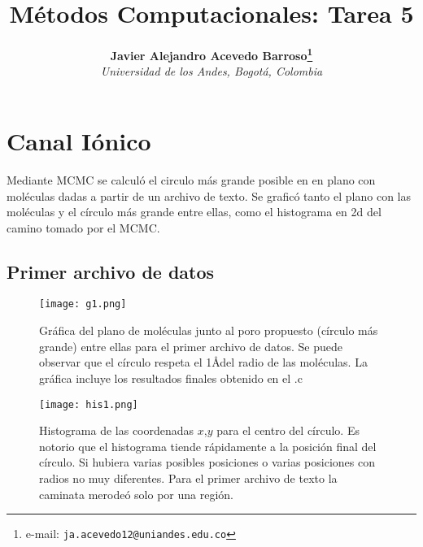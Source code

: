\documentclass[notitlepage,letterpaper,12pt]{article} %
\begin{document}
\title{Métodos Computacionales: Tarea 5
}
\author{
\textbf{Javier Alejandro Acevedo Barroso\thanks{e-mail: \texttt{ja.acevedo12@uniandes.edu.co}}}\\
\textit{Universidad de los Andes, Bogotá, Colombia}\\
} %

\maketitle %



\section{Canal Iónico}

Mediante MCMC se calculó el circulo más grande posible en en plano con moléculas dadas a partir de un archivo de texto. Se graficó tanto el plano con las moléculas y el círculo más grande entre ellas, como el histograma en 2d del camino tomado por el MCMC.

\subsection{Primer archivo de datos}


\begin{figure}[h]
  \centering
   \texttt{[image: g1.png]}
  \caption{Gráfica del plano de moléculas junto al poro propuesto (círculo más grande) entre ellas para el primer archivo de datos. Se puede observar que el círculo respeta el 1\AA  del radio de las moléculas. La gráfica incluye los resultados finales obtenido en el .c}
  \label{g1d1}
\end{figure}
\newpage

\begin{figure}[h]
  \centering
   \texttt{[image: his1.png]}
  \caption{Histograma de las coordenadas $x$,$y$ para el centro del círculo. Es notorio que el histograma tiende rápidamente a la posición final del círculo. Si hubiera varias posibles posiciones o varias posiciones con radios no muy diferentes. Para el primer archivo de texto la caminata merodeó solo por una región. }
  \label{g2d1}
\end{figure}
\end{document}
